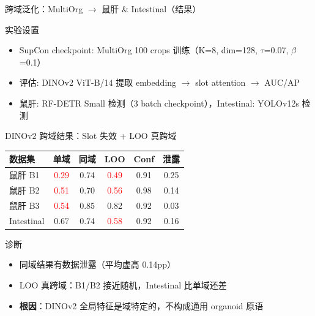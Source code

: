 \documentclass[aspectratio=169, 10pt]{beamer}
\begin{document}
\begin{frame}{跨域泛化：MultiOrg $\to$ 鼠肝 \& Intestinal（结果）}
  \begin{block}{实验设置}
    \begin{itemize}
      \item SupCon checkpoint: MultiOrg 100 crops 训练（K=8, dim=128, $\tau$=0.07, $\beta$=0.1）
      \item 评估: DINOv2 ViT-B/14 提取 embedding $\to$ slot attention $\to$ AUC/AP
      \item 鼠肝: RF-DETR Small 检测（3 batch checkpoint），Intestinal: YOLOv12s 检测
    \end{itemize}
  \end{block}
  \vspace{0em}
  \begin{alertblock}{DINOv2 跨域结果：Slot 失效 + LOO 真跨域}
    \footnotesize
    \begin{tabular}{lccccc}
      \toprule
      \textbf{数据集} & \textbf{单域} & \textbf{同域} & \textbf{LOO} & \textbf{Conf} & \textbf{泄露} \\
      \midrule
      鼠肝 B1 & \textcolor{red}{0.29} & 0.74 & \textcolor{red}{0.49} & 0.91 & 0.25 \\
      鼠肝 B2 & \textcolor{red}{0.51} & 0.70 & \textcolor{red}{0.56} & 0.98 & 0.14 \\
      鼠肝 B3 & \textcolor{red}{0.54} & 0.85 & 0.82 & 0.92 & 0.03 \\
      Intestinal & 0.67 & 0.74 & \textcolor{red}{0.58} & 0.92 & 0.16 \\
      \bottomrule
    \end{tabular}
  \end{alertblock}
  \vspace{0em}
  \begin{block}{诊断}
    \begin{itemize}
      \item 同域结果有数据泄露（平均虚高 0.14pp）
      \item LOO 真跨域：B1/B2 接近随机，Intestinal 比单域还差
      \item \textbf{根因}：DINOv2 全局特征是域特定的，不构成通用 organoid 原语
    \end{itemize}
  \end{block}
\end{frame}
\end{document}
